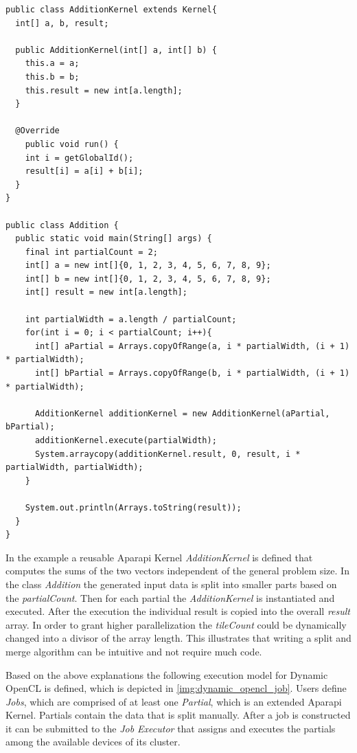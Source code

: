 \begin{lstlisting}[caption=Partial Aparapi Vector Addition Kernel,captionpos=b,label=lst:split_addition]
public class AdditionKernel extends Kernel{
  int[] a, b, result;

  public AdditionKernel(int[] a, int[] b) {
    this.a = a;
    this.b = b;
    this.result = new int[a.length];
  }

  @Override
    public void run() {
    int i = getGlobalId();
    result[i] = a[i] + b[i];
  }
}

public class Addition {
  public static void main(String[] args) {
    final int partialCount = 2;
	int[] a = new int[]{0, 1, 2, 3, 4, 5, 6, 7, 8, 9};
	int[] b = new int[]{0, 1, 2, 3, 4, 5, 6, 7, 8, 9};
	int[] result = new int[a.length];
	
	int partialWidth = a.length / partialCount;
	for(int i = 0; i < partialCount; i++){
      int[] aPartial = Arrays.copyOfRange(a, i * partialWidth, (i + 1) * partialWidth);
      int[] bPartial = Arrays.copyOfRange(b, i * partialWidth, (i + 1) * partialWidth);
	
	  AdditionKernel additionKernel = new AdditionKernel(aPartial, bPartial);
      additionKernel.execute(partialWidth);
      System.arraycopy(additionKernel.result, 0, result, i * partialWidth, partialWidth);
	}
	
	System.out.println(Arrays.toString(result));
  }
}

\end{lstlisting}

In the example a reusable Aparapi Kernel \textit{AdditionKernel} is defined that computes the sums of the two vectors independent of the general problem size. In the class \textit{Addition} the generated input data is split into smaller parts based on the \textit{partialCount}. Then for each partial the \textit{AdditionKernel} is instantiated and executed. After the execution the individual result is copied into the overall \textit{result} array. In order to grant higher parallelization the \textit{tileCount} could be dynamically changed into a divisor of the array length. This illustrates that writing a split and merge algorithm can be intuitive and not require much code.

Based on the above explanations the following execution model for Dynamic OpenCL is defined, which is depicted in \ref{img:dynamic_opencl_job}. Users define \textit{Jobs}, which are comprised of at least one \textit{Partial}, which is an extended Aparapi Kernel. Partials contain the data that is split manually. After a job is constructed it can be submitted to the \textit{Job Executor} that assigns and executes the partials among the available devices of its cluster.

